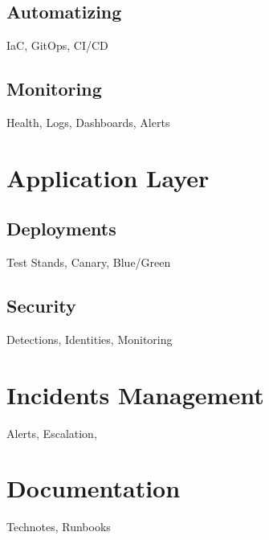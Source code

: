 \subsection{Automatizing}
IaC, GitOps, CI/CD

\subsection{Monitoring}
Health, Logs, Dashboards, Alerts

\section{Application Layer} \label{sec:application}

\subsection{Deployments}
Test Stands, Canary, Blue/Green

\subsection{Security}
Detections, Identities, Monitoring

\section{Incidents Management}
Alerts, Escalation,

\section{Documentation}
Technotes, Runbooks
